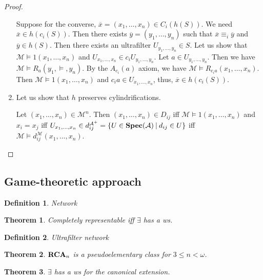 \documentclass{article}
\theoremstyle{defin}
\newtheorem{definition}{Definition}
\theoremstyle{theorem}
\newtheorem{theorem}{Theorem}
\theoremstyle{claim}
\theoremstyle{prop}
\theoremstyle{lemma}
\theoremstyle{fact}
\theoremstyle{remark}
\theoremstyle{ex}
\theoremstyle{col}
\theoremstyle{question}
\begin{document}
\begin{proof}
\begin{enumerate}
Suppose for the converse, $\overline{x} = (x_1, \dots, x_n) \in C_i (h(S))$. We need $\overline{x} \in h(c_i(S))$.
Then there exists $\overline{y} = (y_1, \dots, y_n)$ such that $\overline{x} \equiv_i \overline{y}$ and $\overline{y} \in h(S)$.
Then there exists an ultrafilter $U_{y_1, \dots, y_n} \in S$. Let us show that $\mathcal{M} \models 1(x_1, \dots, x_n)$
and $U_{x_1, \dots, x_n} \in c_i U_{y_1, \dots, y_n}$.
Let $a \in U_{y_1, \dots, y_n}$. Then we have $\mathcal{M} \models R_a(y_1, \models, y_n)$. 
By the $A_{c_i}(a)$ axiom, we have $\mathcal{M} \models R_{c_i a}(x_1, \dots, x_n)$. Then $\mathcal{M} \models 1(x_1, \dots, x_n)$
and $c_i a \in U_{x_1, \dots, x_n}$, thus, $\overline{x} \in h(c_i(S))$.
\item Let us show that $h$ preserves cylindrifications.

Let $(x_1, \dots, x_n) \in \mathcal{M}^n$. Then $(x_1, \dots, x_n) \in D_{ij}$ iff $\mathcal{M} \models 1(x_1, \dots, x_n)$
and $x_i = x_j$ iff $U_{x_1, \dots, x_n} \in d_{ij}^{\mathcal{A}^{+}} = \{ U \in {\bf Spec}(\mathcal{A}) \: | \: d_{ij} \in U \}$ 
iff $\mathcal{M} \models d_{ij}^{\mathcal{M}}(x_1, \dots, x_n)$.
\end{enumerate}
\end{proof}

\subsection{Game-theoretic approach}

\begin{definition}

Network
\end{definition}

\begin{theorem}

Completely representable iff $\exists$ has a ws.
\end{theorem}

\begin{definition}
Ultrafilter network
\end{definition}

\begin{theorem}
${\bf RCA}_n$ is a pseudoelementary class for $3 \leq n < \omega$.
\end{theorem}

\begin{theorem}

$\exists$ has a ws for the canonical extension.

\end{theorem}
\end{document}
